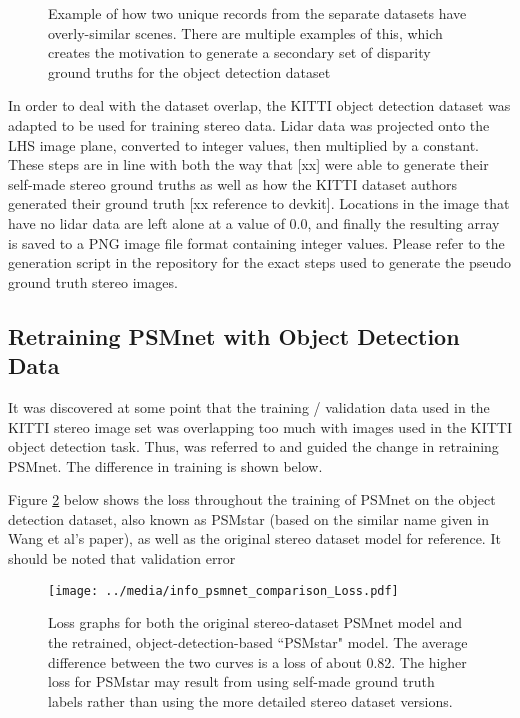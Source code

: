 \begin{figure}[H]
    \centering
    \caption{Example of how two unique records from the separate datasets have overly-similar scenes. There are multiple examples of this, which creates the motivation to generate a secondary set of disparity ground truths for the object detection dataset}
    \label{similarity_stereo_objdet}
\end{figure}

In order to deal with the dataset overlap, the KITTI object detection dataset was adapted to be used for training stereo data. Lidar data was projected onto the LHS image plane, converted to integer values, then multiplied by a constant. These steps are in line with both the way that [xx] were able to generate their self-made stereo ground truths as well as how the KITTI dataset authors generated their ground truth [xx reference to devkit]. Locations in the image that have no lidar data are left alone at a value of 0.0, and finally the resulting array is saved to a PNG image file format containing integer values. Please refer to the generation script in the repository for the exact steps used to generate the pseudo ground truth stereo images.

\subsection{Retraining PSMnet with Object Detection Data}
It was discovered at some point that the training / validation data used in the KITTI stereo image set was overlapping too much with images used in the KITTI object detection task. Thus, \cite{wang_pseudo-lidar_2019} was referred to and guided the change in retraining PSMnet. The difference in training is shown below.

Figure \ref{psmnet_star_train_info} below shows the loss throughout the training of PSMnet on the object detection dataset, also known as PSMstar (based on the similar name given in Wang et al's paper), as well as the original stereo dataset model for reference. It should be noted that validation error 



\begin{figure}[H]
    \centering
        \texttt{[image: ../media/info\_psmnet\_comparison\_Loss.pdf]}
    \caption{Loss graphs for both the original stereo-dataset PSMnet model and the retrained, object-detection-based ``PSMstar" model. The average difference between the two curves is a loss of about 0.82. The higher loss for PSMstar may result from using self-made ground truth labels rather than using the more detailed stereo dataset versions.}
    \label{psmnet_star_train_info}
\end{figure}

